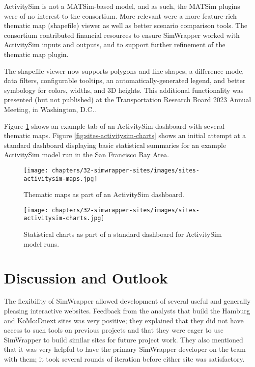 ActivitySim is not a MATSim-based model, and as such, the MATSim plugins were of no interest to the consortium. More relevant were a more feature-rich thematic map (shapefile) viewer as well as better scenario comparison tools. The consortium contributed financial resources to ensure SimWrapper worked with ActivitySim inputs and outputs, and to support further refinement of the thematic map plugin.

The shapefile viewer now supports polygons and line shapes, a difference mode, data filters, configurable tooltips, an automatically-generated legend, and better symbology for colors, widths, and 3D heights. This additional functionality was presented (but not published) at the Transportation Research Board 2023 Annual Meeting, in Washington, D.C..

Figure \ref{fig:sites-activitysim-maps} shows an example tab of an ActivitySim dashboard with several thematic maps. Figure \ref{fig:sites-activitysim-charts} shows an initial attempt at a standard dashboard displaying basic statistical summaries for an example ActivitySim model run in the San Francisco Bay Area.

\begin{figure}[ht]
  \centering
  \texttt{[image: chapters/32-simwrapper-sites/images/sites-activitysim-maps.jpg]}
  \caption{Thematic maps as part of an ActivitySim dashboard.}
  \label{fig:sites-activitysim-maps}
\end{figure}

\begin{figure}[ht]
  \centering
  \texttt{[image: chapters/32-simwrapper-sites/images/sites-activitysim-charts.jpg]}
  \caption{Statistical charts as part of a standard dashboard for ActivitySim model runs.}
  \label{fig:sites-activitysi-charts}
\end{figure}

\section{Discussion and Outlook}
\label{sites-discussion}

The flexibility of SimWrapper allowed development of several useful and generally pleasing interactive websites. Feedback from the analysts that build the Hamburg and KoMo:Dnext sites was very positive; they explained that they did not have access to such tools on previous projects and that they were eager to use SimWrapper to build similar sites for future project work. They also mentioned that it was very helpful to have the primary SimWrapper developer on the team with them; it took several rounds of iteration before either site was satisfactory.

